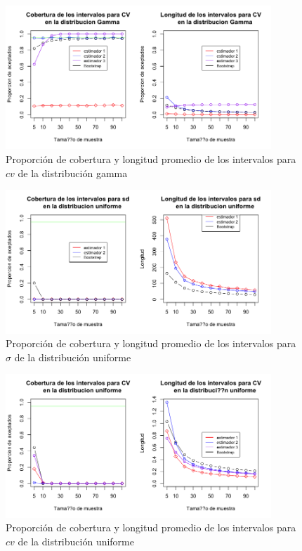 \documentclass[letterpaper,12pt,onecolumn,titlepage]{article}
\begin{document}
\begin{figure}[!h]
    \begin{center}
        \includegraphics[width=10cm]{Figuras/Rplot03.png}
        \caption{Proporci\'{o}n de cobertura y longitud promedio de los intervalos para $cv$ de la distribuci\'{o}n gamma}
        \label{fig:Densidad}
    \end{center}
\end{figure}

\begin{figure}[!h]
    \begin{center}
        \includegraphics[width=10cm]{Figuras/Rplot04.png}
        \caption{Proporci\'{o}n de cobertura y longitud promedio de los intervalos para $\sigma$ de la distribuci\'{o}n uniforme}
        \label{fig:Densidad}
    \end{center}
\end{figure}

\begin{figure}[!h]
    \begin{center}
        \includegraphics[width=10cm]{Figuras/Rplot05.png}
        \caption{Proporci\'{o}n de cobertura y longitud promedio de los intervalos para $cv$ de la distribuci\'{o}n uniforme}
        \label{fig:Densidad}
    \end{center}
\end{figure}


\end{document}
